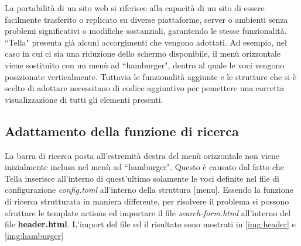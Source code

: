 \documentclass[target=bach,aauheader=]{thud}
\begin{document}
\newline
La portabilità di un sito web si riferisce alla capacità di un sito di essere facilmente trasferito o replicato su diverse piattaforme, server o ambienti senza problemi significativi o modifiche sostanziali, garantendo le stesse funzionalità. \cite{chiuchi2011efficiency}
\newline
``Tella" presenta già alcuni accorgimenti che vengono adottati. Ad esempio, nel caso in cui ci sia una riduzione dello schermo disponibile, 
il menù orizzontale viene sostituito con un menù ad ``hamburger", dentro al quale le voci vengono posizionate verticalmente.
\newline
Tuttavia le funzionalità aggiunte e le strutture che si è scelto di adottare necessitano di codice aggiuntivo per pemettere una corretta visualizzazione di tutti gli elementi presenti.
\subsection{Adattamento della funzione di ricerca}
La barra di ricerca posta all'estremità destra del menù orizzontale non viene inizialmente inclusa nel menù ad ``hamburger". 
Questo è causato dal fatto che Tella inserisce all'interno di quest'ultimo solamente le voci definite nel file di configurazione \textit{config.toml} all'interno della struttura [menu].
\newline
Essendo la funzione di ricerca strutturata in maniera differente, per risolvere il problema si possono sfruttare le template actions ed importare il file \textit{search-form.html} all'interno del file \textbf{header.html}. 
L'import del file ed il risultato sono mostrati in \cref{img:header} e \cref{img:hamburger}

\end{document}
